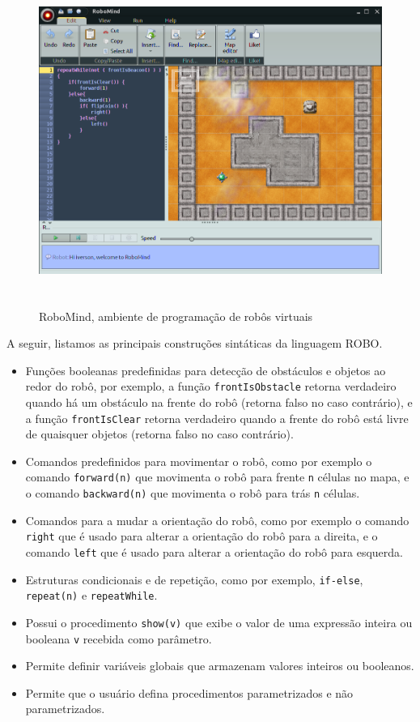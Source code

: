 \begin{figure}[ht]
\centering
\caption{RoboMind, ambiente de programação de robôs virtuais}
\includegraphics[height=10cm]{figuras/robomind_ide3.png}
\label{fig:robomind}
\end{figure}


A seguir, listamos as principais construções sintáticas da linguagem ROBO.

\begin{itemize}
    \item Funções booleanas predefinidas para detecção de obstáculos e objetos ao redor do robô, por exemplo, a função \texttt{frontIsObstacle} retorna verdadeiro quando há um obstáculo na frente do robô (retorna falso no caso contrário), e a função \texttt{frontIsClear} retorna verdadeiro quando a frente do robô está livre de quaisquer objetos (retorna falso no caso contrário).
    \item Comandos predefinidos para movimentar o robô, como por exemplo o comando \texttt{forward(n)} que movimenta o robô para frente \texttt{n} células no mapa, e o comando \texttt{backward(n)} que movimenta o robô para trás \texttt{n} células.
    \item Comandos para a mudar a orientação do robô, como por exemplo o comando \texttt{right} que é usado para alterar a orientação do robô para a direita, e o comando \texttt{left} que é usado para alterar a orientação do robô para esquerda.
    \item Estruturas condicionais e de repetição, como por exemplo, \texttt{if-else}, \texttt{repeat(n)} e \texttt{repeatWhile}.
    \item Possui o procedimento \texttt{show(v)} que exibe o valor de uma expressão inteira ou booleana \texttt{v} recebida como parâmetro.
    \item Permite definir variáveis globais que armazenam valores inteiros ou booleanos.
    \item Permite que o usuário defina procedimentos parametrizados e não parametrizados.
\end{itemize}

